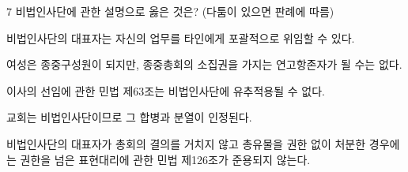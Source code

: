 \begin{question}{7}
비법인사단에 관한 설명으로 옳은 것은? (다툼이 있으면 판례에 따름)
\begin{choices}
  \item 비법인사단의 대표자는 자신의 업무를 타인에게 포괄적으로 위임할 수 있다.
  \item 여성은 종중구성원이 되지만, 종중총회의 소집권을 가지는 연고항존자가 될 수는 없다.
  \item 이사의 선임에 관한 민법 제63조는 비법인사단에 유추적용될 수 없다.
  \item 교회는 비법인사단이므로 그 합병과 분열이 인정된다.
  \item 비법인사단의 대표자가 총회의 결의를 거치지 않고 총유물을 권한 없이 처분한 경우에는 권한을 넘은 표현대리에 관한 민법 제126조가 준용되지 않는다.
\end{choices}
\end{question}
